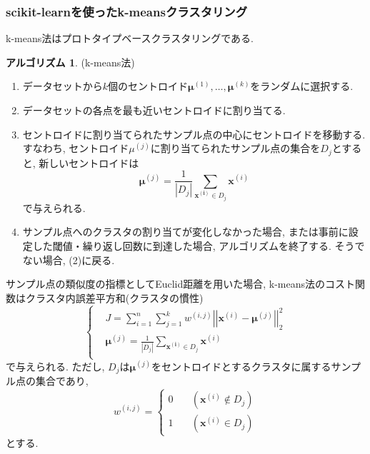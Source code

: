 \documentclass[uplatex]{jsarticle}
\theoremstyle{definition}
\newtheorem{algorithm}[definition]{アルゴリズム}
\numberwithin{equation}{section}
\newcommand{\norm}[1]{\left|\left|#1\right|\right|}
\begin{document}
\subsubsection{scikit-learnを使ったk-meansクラスタリング}
k-means法はプロトタイプベースクラスタリングである.
\begin{algorithm}
    (k-means法)
    \begin{enumerate}
        \item
        データセットから$k$個のセントロイド$\bm{\mu}^{(1)}, \dots, \bm{\mu}^{(k)}$をランダムに選択する.

        \item
        データセットの各点を最も近いセントロイドに割り当てる.

        \item
        セントロイドに割り当てられたサンプル点の中心にセントロイドを移動する.
        すなわち, セントロイド$\mu^{(j)}$に割り当てられたサンプル点の集合を$D_{j}$とすると, 新しいセントロイドは
        \begin{equation}
            \bm{\mu}^{(j)} = \frac{1}{|D_{j}|}\sum_{\bm{x^{(i)}} \in D_{j}} \bm{x}^{(i)}
        \end{equation}
        で与えられる.

        \item
        サンプル点へのクラスタの割り当てが変化しなかった場合, または事前に設定した閾値・繰り返し回数に到達した場合, アルゴリズムを終了する.
        そうでない場合, (2)に戻る.
    \end{enumerate}
\end{algorithm}

サンプル点の類似度の指標としてEuclid距離を用いた場合, k-means法のコスト関数はクラスタ内誤差平方和(クラスタの慣性)
\begin{equation}
    \left\{
    \begin{aligned}
        &J = \sum_{i = 1}^{n} \sum_{j = 1}^{k} w^{(i, j)}\norm{\bm{x}^{(i)} - \bm{\mu}^{(j)}}_{2}^{2} \\
        &\bm{\mu}^{(j)} = \frac{1}{|D_{j}|}\sum_{\bm{x^{(i)}} \in D_{j}} \bm{x}^{(i)} \\
    \end{aligned}
    \right.
\end{equation}
で与えられる.
ただし, $D_{j}$は$\bm{\mu}^{(j)}$をセントロイドとするクラスタに属するサンプル点の集合であり, 
\begin{equation}
    w^{(i, j)} = 
    \begin{cases}
        0 &\quad (\bm{x}^{(i)} \notin D_{j}) \\
        1 &\quad (\bm{x}^{(i)} \in D_{j})
    \end{cases}
\end{equation}
とする.
\end{document}
